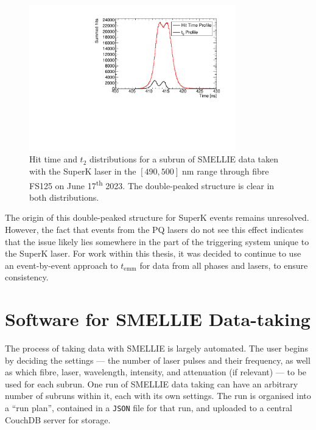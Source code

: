 \begin{figure}
    \centering
    \includegraphics[width=0.8\textwidth]{3_SMELLIEHardware/images/time_t2_plot_310303_SK495_FS125.pdf}
    \caption[]{Hit time and $t_{2}$ distributions for a subrun of SMELLIE data taken with the SuperK laser in the $[490,500]\;\si{\nm}$ range through fibre FS125 on June 17\textsuperscript{th} 2023. The double-peaked structure is clear in both distributions.}
    \label{fig:smellie_superk_double_peaks}
\end{figure}

The origin of this double-peaked structure for SuperK events remains unresolved. However, the fact that events from the PQ lasers do not see this effect indicates that the issue likely lies somewhere in the part of the triggering system unique to the SuperK laser. For work within this thesis, it was decided to continue to use an event-by-event approach to $t_{\mathrm{emm}}$ for data from all phases and lasers, to ensure consistency.


\section{Software for SMELLIE Data-taking}\label{sec:smellie_software}
The process of taking data with SMELLIE is largely automated. The user begins by deciding the settings --- the number of laser pulses and their frequency, as well as which fibre, laser, wavelength, intensity, and attenuation (if relevant) --- to be used for each subrun. One run of SMELLIE data taking can have an arbitrary number of subruns within it, each with its own settings. The run is organised into a ``run plan'', contained in a \texttt{JSON} file for that run, and uploaded to a central CouchDB server for storage.

